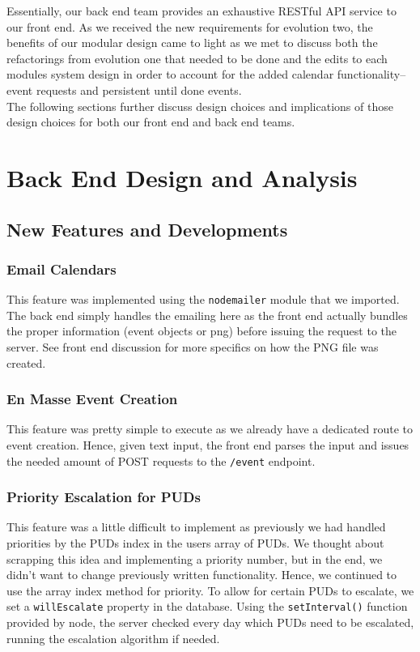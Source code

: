 \documentclass[11pt]{article}   %
\begin{document}
\noindent Essentially, our back end team provides an exhaustive RESTful API service to our front end. As we received the new requirements for evolution two, the benefits of our modular design came to light as we met to discuss both the refactorings from evolution one that needed to be done and the edits to each modules system design in order to account for the added calendar functionality--event requests and persistent until done events.\\

\noindent The following sections further discuss design choices and implications of those design choices for both our front end and back end teams. \\

\section{Back End Design and Analysis}
\subsection{New Features and Developments}
\subsubsection*{Email Calendars}
This feature was implemented using the \texttt{nodemailer} module that we imported. The back end simply handles the emailing here as the front end actually bundles the proper information (event objects or png) before issuing the request to the server. See front end discussion for more specifics on how the PNG file was created. 
\subsubsection*{En Masse Event Creation}
This feature was pretty simple to execute as we already have a dedicated route to event creation. Hence, given text input, the front end parses the input and issues the needed amount of POST requests to the \texttt{/event} endpoint.
\subsubsection*{Priority Escalation for PUDs}
This feature was a little difficult to implement as previously we had handled priorities by the PUDs index in the users array of PUDs. We thought about scrapping this idea and implementing a priority number, but in the end, we didn't want to change previously written functionality. Hence, we continued to use the array index method for priority. To allow for certain PUDs to escalate, we set a \texttt{willEscalate} property in the database. Using the \texttt{setInterval()} function provided by node, the server checked every day which PUDs need to be escalated, running the escalation algorithm if needed.
\end{document}
